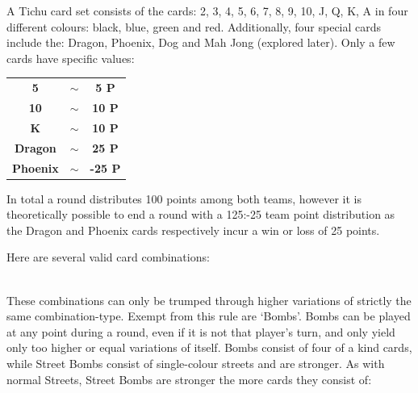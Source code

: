A Tichu card set consists of the cards: 2, 3, 4, 5, 6, 7, 8, 9, 10, J, Q, K, A in four different colours: black, blue, green and red. Additionally, four special cards include the: Dragon, Phoenix, Dog and Mah Jong (explored later). Only a few cards have specific values:\\
\begin{scriptsize}
\begin{center}
\begin{tabular}{ c c c }
\textbf{5} & $\sim$  & \textbf{5 P} \\
\textbf{10} & $\sim$ & \textbf{10 P} \\
\textbf{K} & $\sim$  & \textbf{10 P} \\
\textbf{Dragon} & $\sim$ & \textbf{25 P} \\
\textbf{Phoenix} & $\sim$ & \textbf{-25 P}
\end{tabular}
\end{center}
\end{scriptsize}
In total a round distributes 100 points among both teams, however it is theoretically possible to end a round with a 125:-25 team point distribution as the Dragon and Phoenix cards respectively incur a win or loss of 25 points.

Here are several valid card combinations:
\\
\\

These combinations can only be trumped through higher variations of strictly the same combination-type. Exempt from this rule are ‘Bombs’. Bombs can be played at any point during a round, even if it is not that player’s turn, and only yield only too higher or equal variations of itself. Bombs consist of four of a kind cards, while Street Bombs consist of single-colour streets and are stronger. As with normal Streets, Street Bombs are stronger the more cards they consist of:
\\
\\

